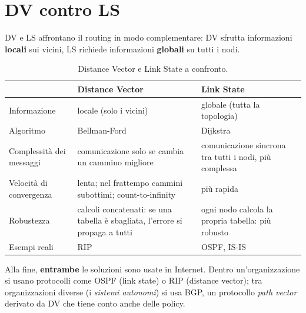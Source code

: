 \section{DV contro LS}

DV e LS affrontano il routing in modo complementare: DV sfrutta informazioni \textbf{locali} sui vicini, LS richiede informazioni
\textbf{globali} su tutti i nodi.

\begin{table}[H]
\centering
\begin{tabular}{p{3cm}p{5.8cm}p{5.8cm}}
\toprule
 & \textbf{Distance Vector} & \textbf{Link State} \\
\midrule
Informazione & locale (solo i vicini) & globale (tutta la topologia) \\
Algoritmo & Bellman-Ford & Dijkstra \\
Complessità dei messaggi & comunicazione solo se cambia un cammino migliore & comunicazione sincrona tra tutti i nodi, più complessa \\
Velocità di convergenza & lenta; nel frattempo cammini subottimi; count-to-infinity & più rapida \\
Robustezza & calcoli concatenati: se una tabella è sbagliata, l'errore si propaga a tutti & ogni nodo calcola la propria tabella: più robusto \\
Esempi reali & RIP & OSPF, IS-IS \\
\bottomrule
\end{tabular}
\caption{Distance Vector e Link State a confronto.}
\end{table}


Alla fine, \textbf{entrambe} le soluzioni sono usate in Internet. Dentro un'organizzazione si usano protocolli come OSPF (link state) o
RIP (distance vector); tra organizzazioni diverse (i \emph{sistemi autonomi}) si usa BGP, un protocollo \emph{path vector} derivato da
DV che tiene conto anche delle policy.

